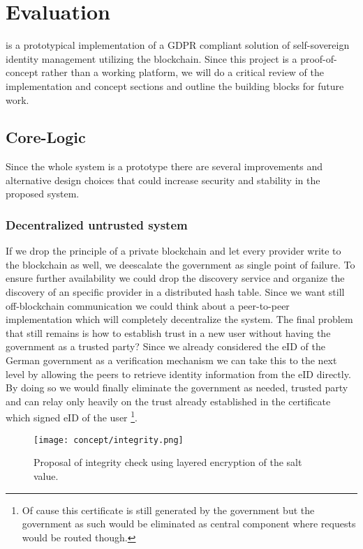 \chapter{Evaluation}
\label{cha:evaluation}

\projectName{} is a prototypical implementation of a GDPR compliant solution of self-sovereign identity management
utilizing the blockchain. Since this project is a proof-of-concept rather than a working platform, we will do a critical
 review of the implementation and concept sections and outline the building blocks for future work.

\section{Core-Logic}
\label{sec:coreLogicEval}
Since the whole system is a prototype there are several improvements and alternative design choices that could increase
security and stability in the proposed system.

\subsection{Decentralized untrusted system}
\label{sec:untrustedSystem}
If we drop the principle of a private blockchain and let every provider write to the blockchain as well, we deescalate
the government as single point of failure.
To ensure further availability we could drop the discovery service and organize the discovery of an specific provider
in a distributed hash table. Since we want still off-blockchain communication we could think about a peer-to-peer
implementation which will completely decentralize the system. The final problem that still remains is how to establish
trust in a new user without having the government as a trusted party? Since we already considered the eID of the German
government as a verification mechanism we can take this to the next level by allowing the peers to retrieve identity
information from the eID directly. By doing so we would finally eliminate the government as needed, trusted party and
can relay only heavily on the trust already established in the certificate which signed eID of the user
\footnote{Of cause this certificate is still generated by the government but the government as such would be eliminated
as central component where requests would be routed though.}.

\begin{figure}
\texttt{[image: concept/integrity.png]}
\centering
\caption{Proposal of integrity check using layered encryption of the salt value.}
\label{fig:integrity}
\end{figure}

